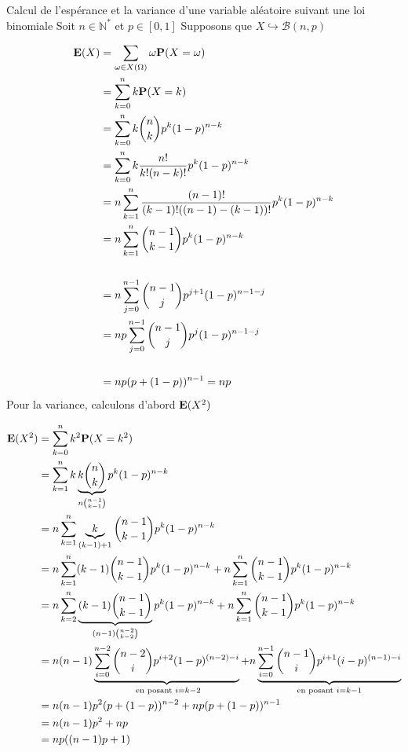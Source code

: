\documentclass{article}
\begin{document}
\begin{question_kholle}{Calcul de l'espérance et la variance d'une variable aléatoire suivant une loi binomiale}
	Soit $n \in \mathbb{N}^*$ et $p \in [0, 1]$
	Supposons que $X \hookrightarrow \mathcal{B}(n, p)$
	
	\begin{align*}
		\mathbf E(X) &= \sum_{\omega \in X(\Omega)}\omega \mathbf P(X = \omega) \\
		& = \sum_{k=0}^{n}k\mathbf P(X=k) \\
		&= \sum_{k=0}^{n}k \binom{n}{k} p^{k}(1-p)^{n-k} \\
		&= \sum_{k=0}^{n}k \frac{n!}{k! (n-k)!} p^{k}(1-p)^{n-k} \\
		&= n \sum_{k=1}^{n} \frac{(n-1)!}{(k-1)! ((n-1)-(k-1))!} p^{k}(1-p)^{n-k} \\
		&= n \sum_{k=1}^{n} \binom{n-1}{k-1} p^{k}(1-p)^{n-k} \\ \\
		&= n \sum_{j=0}^{n-1} \binom{n-1}{j} p^{j+1}(1-p)^{n-1-j} \\
		&= n p \sum_{j=0}^{n-1} \binom{n-1}{j} p^{j}(1-p)^{n-1-j} \\ \\
		&= np (p + (1-p))^{n-1} = np
	\end{align*}
	Pour la variance, calculons d'abord $\mathbf E(X^{2})$
	
	\begin{align*}
		\mathbf E(X^{2}) &= \sum _{k=0}^{n}k^{2} \mathbf P(X=k^{2}) \\
		&=  \sum_{k=1}^{n} k \underbrace{ k \binom{n}{k} }_{ n \binom{n-1}{k-1} }p^{k}(1-p)^{n-k} \\
		&= n \sum_{k=1}^{n} \underbrace{ k }_{ (k-1)+1 } \binom{n-1}{k-1} p^{k}(1-p)^{n-k} \\
		&= n \sum_{k=1}^{n}(k-1)\binom{n-1}{k-1}p^{k}(1-p)^{n-k}+ n \sum_{k=1}^{n}\binom{n-1}{k-1}p^{k}(1-p)^{n-k} \\
		&= n \sum_{k=2}^{n}\underbrace{ (k-1)\binom{n-1}{k-1} }_{ (n-1)\binom{n-2}{k-2} } p^{k}(1-p)^{n-k} + n \sum_{k=1}^{n}\binom{n-1}{k-1}p^{k}(1-p)^{n-k} \\
		&= n(n-1) \underbrace{ \sum_{i=0}^{n-2}\binom{n-2}{i}p^{i+2}(1-p)^{(n-2)-i}  }_{ \text{ en posant } i = k-2 }+ n \underbrace{ \sum_{i=0}^{n-1}\binom{n-1}{i}p^{i+1}(i-p)^{(n-1)-i} }_{ \text{en posant }i=k-1 } \\
		&= n(n-1)p^{2}(p+(1-p))^{n-2} + np(p+(1-p))^{n-1} \\
		&= n(n-1)p^{2}+np \\
		&= np((n-1)p+1)
	\end{align*}
	

\end{question_kholle}
\end{document}
